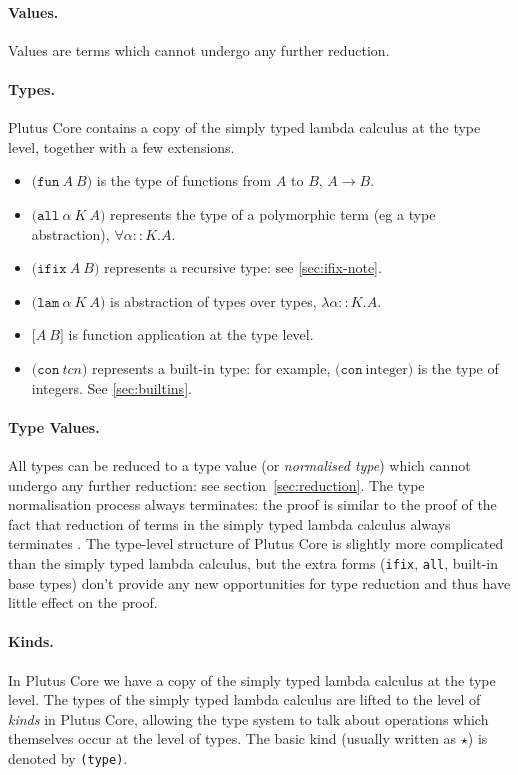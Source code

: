 \documentclass[a4paper]{article}
\newcommand{\keyword}[1]{\texttt{#1}}
\newcommand{\construct}[1]{\texttt{(} #1 \texttt{)}}
\newcommand{\funT}[2]{\construct{\keyword{fun} ~ #1 ~ #2}}
\newcommand{\ifixT}[2]{\construct{\keyword{ifix} ~ #1 ~ #2}}
\newcommand{\fixT}{\ifixT}
\newcommand{\allT}[3]{\construct{\keyword{all} ~ #1 ~ #2 ~ #3}}
\newcommand{\conT}[1]{\construct{\keyword{con} ~ #1}}
\newcommand{\lamT}[3]{\construct{\keyword{lam} ~ #1 ~ #2 ~ #3}}
\newcommand{\appT}[2]{\texttt{[} #1 ~ #2 \texttt{]}}
\begin{document}
\paragraph{Values.} Values are terms which cannot undergo any further reduction.

\paragraph{Types.} Plutus Core contains a copy of the simply typed lambda calculus
  at the type level, together with a few extensions.
\begin{itemize}
\item $\funT{A}{B}$ is the type of functions from $A$ to $B$, $A \rightarrow B$.
\item $\allT{\alpha}{K}{A}$ represents the type of a polymorphic term (eg a type abstraction), $\forall \alpha{::}K.A$.
\item $\fixT{A}{B}$ represents a recursive type: see \cref{sec:ifix-note}.
\item $\lamT{\alpha}{K}{A}$ is abstraction of types over types, $\lambda \alpha{::}K.A$.
\item $\appT{A}{B}$ is function application at the type level.
\item $\conT{tcn}$ represents a built-in type: for example, $\conT{\textrm{integer}}$
is the type of integers.  See \cref{sec:builtins}.
\end{itemize}

\paragraph{Type Values.} All types can be reduced to a type value (or
  \emph{normalised type}) which cannot undergo any further
  reduction: see section~\ref{sec:reduction}.  The type normalisation
  process always terminates: the proof is similar to the proof of the
  fact that reduction of terms in the simply typed lambda calculus
  always terminates \citep[\S12]{Pierce:TAPL}.  The type-level
  structure of Plutus Core is slightly more complicated than the
  simply typed lambda calculus, but the extra forms (\texttt{ifix},
  \texttt{all}, built-in base types) don't provide any new
  opportunities for type reduction and thus have little effect on the
  proof.

\paragraph{Kinds.} In Plutus Core we have a copy of the
simply typed lambda calculus at the type level. The types of the
simply typed lambda calculus are lifted to the level of
\emph{kinds} in Plutus Core, allowing the type system to talk about
operations which themselves occur at the level of types.
The basic kind (usually written as $\star$) is denoted by \texttt{(type)}.
\end{document}
